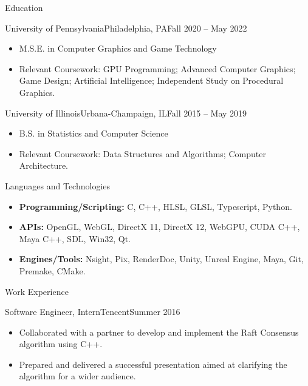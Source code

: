 \documentclass[]{mcdowellcv}
\begin{document}
	\makeheader
	

	\begin{cvsection}{Education}
		\begin{cvsubsection}{University of Pennsylvania}{Philadelphia, PA}{Fall 2020 -- May 2022}
			\begin{itemize}
				\item M.S.E. in Computer Graphics and Game Technology
				\item Relevant Coursework: GPU Programming; Advanced Computer Graphics; Game Design; Artificial Intelligence; Independent Study on Procedural Graphics. 
			\end{itemize}
		\end{cvsubsection}
		\begin{cvsubsection}{University of Illinois}{Urbana-Champaign, IL}{Fall 2015 -- May 2019}
			\begin{itemize}
				\item B.S. in Statistics and Computer Science
				\item Relevant Coursework: Data Structures and Algorithms; Computer Architecture.
			\end{itemize}
		\end{cvsubsection}
	\end{cvsection}

	\begin{cvsection}{Languages and Technologies}
		\begin{cvsubsection}{}{}{}	
			\begin{itemize}
				\item \textbf{Programming/Scripting:} C, C++, HLSL, GLSL, Typescript, Python.
				\item \textbf{APIs:} OpenGL, WebGL, DirectX 11, DirectX 12, WebGPU, CUDA C++, Maya C++, SDL, Win32, Qt. 
				\item \textbf{Engines/Tools:} Nsight, Pix, RenderDoc, Unity, Unreal Engine, Maya, Git, Premake, CMake.
			\end{itemize}
		\end{cvsubsection}
	\end{cvsection}
	
	\begin{cvsection}{Work Experience}
		\begin{cvsubsection}{Software Engineer, Intern}{Tencent}{Summer 2016}	
			\begin{itemize}
				\item Collaborated with a partner to develop and implement the Raft Consensus algorithm using C++.
				\item Prepared and delivered a successful presentation aimed at clarifying the algorithm for a wider audience.
			\end{itemize}
		\end{cvsubsection}
	\end{cvsection}
	
\end{document}
